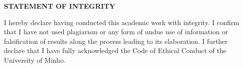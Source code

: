 
\begin{center}
    \noindent \textbf{STATEMENT OF INTEGRITY}
\end{center}
\bigbreak
\noindent I hereby declare having conducted this academic work with integrity. I confirm that I have not used
plagiarism or any form of undue use of information or falsification of results along the process leading to
its elaboration.
\noindent I further declare that I have fully acknowledged the Code of Ethical Conduct of the University of Minho.
\vspace{3.5cm}
